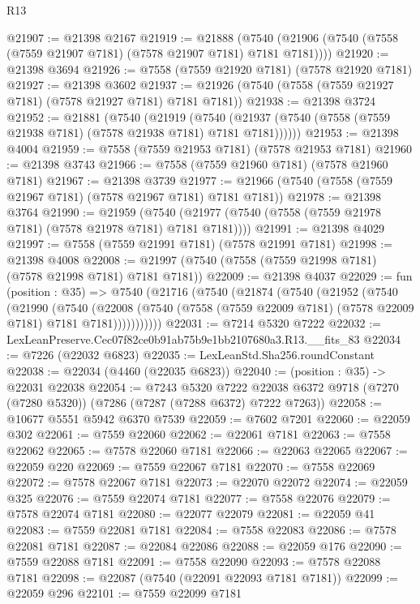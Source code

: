 \begin{lexlean}{R13}
\begin{coremodule}
@21907 := @21398 @2167
@21919 := @21888
    (@7540 (@21906 (@7540 (@7558 (@7559 @21907 @7181) (@7578 @21907 @7181) @7181 @7181))))
@21920 := @21398 @3694
@21926 := @7558 (@7559 @21920 @7181) (@7578 @21920 @7181)
@21927 := @21398 @3602
@21937 := @21926 (@7540 (@7558 (@7559 @21927 @7181) (@7578 @21927 @7181) @7181 @7181))
@21938 := @21398 @3724
@21952 := @21881
    (@7540
      (@21919
        (@7540 (@21937 (@7540 (@7558 (@7559 @21938 @7181) (@7578 @21938 @7181) @7181 @7181))))))
@21953 := @21398 @4004
@21959 := @7558 (@7559 @21953 @7181) (@7578 @21953 @7181)
@21960 := @21398 @3743
@21966 := @7558 (@7559 @21960 @7181) (@7578 @21960 @7181)
@21967 := @21398 @3739
@21977 := @21966 (@7540 (@7558 (@7559 @21967 @7181) (@7578 @21967 @7181) @7181 @7181))
@21978 := @21398 @3764
@21990 := @21959
    (@7540 (@21977 (@7540 (@7558 (@7559 @21978 @7181) (@7578 @21978 @7181) @7181 @7181))))
@21991 := @21398 @4029
@21997 := @7558 (@7559 @21991 @7181) (@7578 @21991 @7181)
@21998 := @21398 @4008
@22008 := @21997 (@7540 (@7558 (@7559 @21998 @7181) (@7578 @21998 @7181) @7181 @7181))
@22009 := @21398 @4037
@22029 := fun (position : @35) =>
  @7540
    (@21716
      (@7540
        (@21874
          (@7540
            (@21952
              (@7540
                (@21990
                  (@7540
                    (@22008
                      (@7540 (@7558 (@7559 @22009 @7181) (@7578 @22009 @7181) @7181 @7181)))))))))))
@22031 := @7214 @5320 @7222
@22032 := LexLeanPreserve.Cec07f82ce0b91ab75b9e1bb2107680a3.R13.__fits_83
@22034 := @7226 (@22032 @6823)
@22035 := LexLeanStd.Sha256.roundConstant
@22038 := @22034 (@4460 (@22035 @6823))
@22040 := (position : @35) -> @22031 @22038
@22054 := @7243
    @5320
    @7222
    @22038
    @6372
    @9718
    (@7270 (@7280 @5320))
    (@7286 (@7287 (@7288 @6372) @7222 @7263))
@22058 := @10677 @5551 @5942 @6370 @7539
@22059 := @7602 @7201
@22060 := @22059 @302
@22061 := @7559 @22060
@22062 := @22061 @7181
@22063 := @7558 @22062
@22065 := @7578 @22060 @7181
@22066 := @22063 @22065
@22067 := @22059 @220
@22069 := @7559 @22067 @7181
@22070 := @7558 @22069
@22072 := @7578 @22067 @7181
@22073 := @22070 @22072
@22074 := @22059 @325
@22076 := @7559 @22074 @7181
@22077 := @7558 @22076
@22079 := @7578 @22074 @7181
@22080 := @22077 @22079
@22081 := @22059 @41
@22083 := @7559 @22081 @7181
@22084 := @7558 @22083
@22086 := @7578 @22081 @7181
@22087 := @22084 @22086
@22088 := @22059 @176
@22090 := @7559 @22088 @7181
@22091 := @7558 @22090
@22093 := @7578 @22088 @7181
@22098 := @22087 (@7540 (@22091 @22093 @7181 @7181))
@22099 := @22059 @296
@22101 := @7559 @22099 @7181

\end{coremodule}
\end{lexlean}
